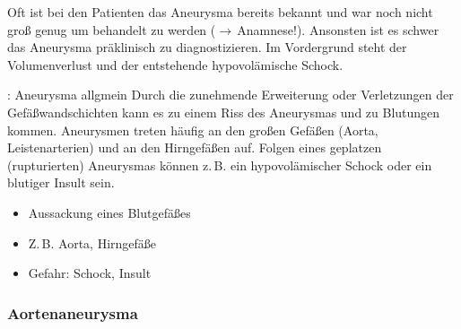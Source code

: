 \documentclass[
ngerman,
paper=a4,
asymmetric,
fontsize=10pt,
draft=false,
numbers=noenddot,
bibtotocnumbered,
footnotes=multiple,
]{scrreprt}
\newcommand{\jALTende}{\newline{\color{red}\rule{\linewidth}{2pt}\newline}}
\newcommand{\jNEU}{\vspace{6pt}\noindent{\color{green}\sffamily\textbf{ADDED}\hrulefill\newline}}
\begin{document}
Oft ist bei den Patienten das Aneurysma bereits bekannt und
war noch nicht groß genug um behandelt zu werden
(${\rightarrow}$\,Anamnese!). Ansonsten ist es schwer das
Aneurysma präklinisch zu diagnostizieren. Im Vordergrund
steht der Volumenverlust und der entstehende hypovolämische
Schock. 
\jALTende

\jNEU
\Text
{{\TxBeschreibung}: Aneurysma allgmein}
{%
Durch die
zunehmende Erweiterung oder Verletzungen der
Gefäßwandschichten kann es zu einem Riss des Aneurysmas und
zu Blutungen kommen. Aneurysmen treten häufig an den großen
Gefäßen (Aorta, Leistenarterien) und an den Hirngefäßen auf.
Folgen eines geplatzen (rupturierten) Aneurysmas können
z.\,B. ein hypovolämischer Schock oder ein blutiger Insult
sein.}
{
\begin{itemize}
  \item Aussackung eines Blutgefäßes
  \item Z.\,B. Aorta, Hirngefäße
  \item Gefahr: Schock, Insult
\end{itemize}
}
{}
{}
{}

\subsubsection{Aortenaneurysma}
 
\end{document}
